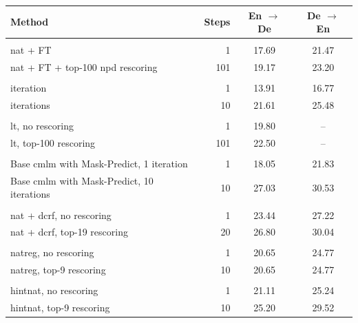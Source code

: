 \begin{table}
  \centering

  \begin{tabular}{lrcc}
    \toprule
    Method & Steps & En $\rightarrow$ De & De $\rightarrow$ En \\
    \midrule
    \citet{gu2017nonautoregressive} & & & \\
    \quad \acs{nat} + FT & 1 & 17.69 & 21.47 \\
    \quad \acs{nat} + FT + top-100 \acs{npd} rescoring & 101 & 19.17 & 23.20 \\

    \citet{lee-etal-2018-deterministic} & & \\
    \quad 1 iteration & 1 & 13.91 & 16.77 \\
    \quad 10 iterations & 10 & 21.61 & 25.48 \\

    \citet{kaiser2018fast} & & \\
    \quad \acs{lt}, no rescoring & 1 & 19.80 & -- \\
    \quad \acs{lt}, top-100 rescoring & 101 & 22.50 & -- \\

    \citet{ghazvininejad-etal-2019-mask} & & \\
    \quad Base \acs{cmlm} with Mask-Predict, 1 iteration & 1 & 18.05 & 21.83 \\
    \quad Base \acs{cmlm} with Mask-Predict, 10 iterations & 10 & 27.03 & 30.53 \\

    \citet{sun2019fast} & & & \\
    \quad \acs{nat} + \acs{dcrf}, no rescoring & 1 & 23.44 & 27.22 \\
    \quad \acs{nat} + \acs{dcrf}, top-19 rescoring & 20 & 26.80 & 30.04 \\

    \citet{wang-etal-2019-nonautoregressive} & & & \\
    \quad \acs{natreg}, no rescoring & 1 &  20.65 & 24.77 \\
    \quad \acs{natreg}, top-9 rescoring & 10 & 20.65 & 24.77 \\

    \citet{li-etal-2019-hint} & & & \\
    \quad \acs{hintnat}, no rescoring & 1 & 21.11  & 25.24 \\
    \quad \acs{hintnat}, top-9 rescoring & 10 & 25.20  & 29.52 \\


\end{tabular}
\end{table}
